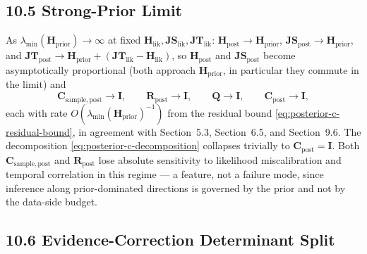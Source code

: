 \documentclass[11pt]{article}
\begin{document}
\subsection*{10.5 Strong-Prior Limit}

As $\lambda_{\min}(\mathbf H_{\mathrm{prior}}) \to \infty$ at fixed $\mathbf H_{\mathrm{lik}}, \mathbf{JS}_{\mathrm{lik}}, \mathbf{JT}_{\mathrm{lik}}$: $\mathbf H_{\mathrm{post}} \to \mathbf H_{\mathrm{prior}}$, $\mathbf{JS}_{\mathrm{post}} \to \mathbf H_{\mathrm{prior}}$, and $\mathbf{JT}_{\mathrm{post}} \to \mathbf H_{\mathrm{prior}} + (\mathbf{JT}_{\mathrm{lik}} - \mathbf H_{\mathrm{lik}})$, so $\mathbf H_{\mathrm{post}}$ and $\mathbf{JS}_{\mathrm{post}}$ become asymptotically proportional (both approach $\mathbf H_{\mathrm{prior}}$, in particular they commute in the limit) and
\begin{equation}
\mathbf C_{\mathrm{sample},\mathrm{post}} \to \mathbf I,
\qquad
\mathbf R_{\mathrm{post}} \to \mathbf I,
\qquad
\mathbf Q \to \mathbf I,
\qquad
\mathbf C_{\mathrm{post}} \to \mathbf I,
\label{eq:posterior-decomp-strong}
\end{equation}
each with rate $O(\lambda_{\min}(\mathbf H_{\mathrm{prior}})^{-1})$ from the residual bound \eqref{eq:posterior-c-residual-bound}, in agreement with Section~5.3, Section~6.5, and Section~9.6. The decomposition \eqref{eq:posterior-c-decomposition} collapses trivially to $\mathbf C_{\mathrm{post}} = \mathbf I$. Both $\mathbf C_{\mathrm{sample},\mathrm{post}}$ and $\mathbf R_{\mathrm{post}}$ lose absolute sensitivity to likelihood miscalibration and temporal correlation in this regime — a feature, not a failure mode, since inference along prior-dominated directions is governed by the prior and not by the data-side budget.

\subsection*{10.6 Evidence-Correction Determinant Split}
\end{document}
